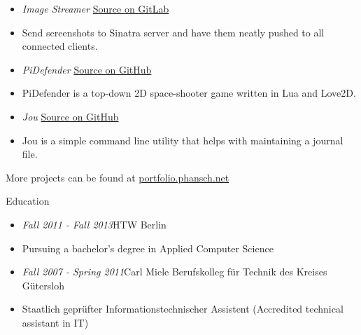 \documentclass[12pt]{article}
\begin{document}
\begin{itemize}
  \setlength{\itemsep}{0cm}
  \setlength{\parskip}{0cm}
  \item[] \emph{Image Streamer} \hfill \href{https://gitlab.com/phansch/screenshot-streamer/tree/master}{Source on GitLab}

  \item[] Send screenshots to Sinatra server and have them neatly pushed to all connected clients.
\end{itemize}

\begin{itemize}
  \setlength{\itemsep}{0cm}
  \setlength{\parskip}{0cm}
  \item[] \emph{PiDefender} \hfill \href{https://gitlab.com/phansch/pidefender/tree/master}{Source on GitHub}

  \item[] PiDefender is a top-down 2D space-shooter game written in Lua and Love2D.
\end{itemize}


\begin{itemize}
  \setlength{\itemsep}{0cm}
  \setlength{\parskip}{0cm}
  \item[] \emph{Jou} \hfill \href{https://github.com/phansch/jou}{Source on GitHub}

  \item[] Jou is a simple command line utility that helps with maintaining a journal file.

\end{itemize}

More projects can be found at \href{http://phansch.net/}{portfolio.phansch.net}

\vspace{0.5cm}
{\Large Education}

\begin{itemize}
  \setlength{\itemsep}{0cm}
  \setlength{\parskip}{0.1cm}
  \item[] \emph{Fall 2011 - Fall 2013}\hfill HTW Berlin
  \item[] Pursuing a bachelor's degree in Applied Computer Science
\end{itemize}

\begin{itemize}
  \setlength{\itemsep}{0cm}
  \setlength{\parskip}{0.1cm}
  \item[] \emph{Fall 2007 - Spring 2011}\hfill Carl Miele Berufskolleg für Technik des Kreises Gütersloh
  \item[] Staatlich geprüfter Informationstechnischer Assistent (Accredited technical assistant in IT)
\end{itemize}
\end{document}
